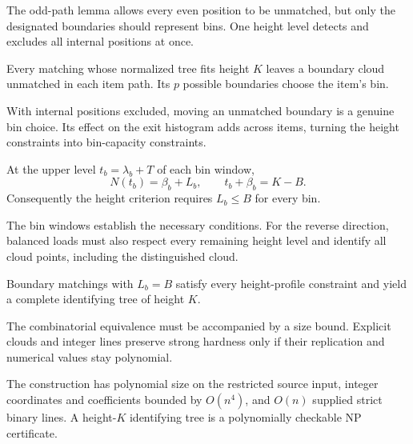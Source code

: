 The odd-path lemma allows every even position to be unmatched,
but only the designated boundaries should represent bins. One height
level detects and excludes all internal positions at once.

\begin{proposition}
\label{prop:height-boundaries}
Every matching whose normalized tree fits height $K$ leaves a
boundary cloud unmatched in each item path. Its $p$ possible boundaries choose the item's bin.
\end{proposition}

With internal positions excluded, moving an unmatched boundary is
a genuine bin choice. Its effect on the exit histogram adds across
items, turning the height constraints into bin-capacity constraints.

\begin{proposition}
\label{prop:height-windows}
At the upper level $t_b=\lambda_b+T$ of each bin window,
\[
 N(t_b)=\beta_b+L_b,\qquad t_b+\beta_b=K-B.
\]
Consequently the height criterion requires $L_b\le B$ for every bin.
\end{proposition}

The bin windows establish the necessary conditions. For the reverse
direction, balanced loads must also respect every remaining height
level and identify all cloud points, including the distinguished cloud.

\begin{proposition}
\label{prop:height-completeness}
Boundary matchings with $L_b=B$ satisfy every height-profile constraint
and yield a complete identifying tree of height $K$.
\end{proposition}

The combinatorial equivalence must be accompanied by a size bound.
Explicit clouds and integer lines preserve strong hardness only if
their replication and numerical values stay polynomial.

\begin{proposition}
\label{prop:height-encoding}
The construction has polynomial size on the restricted source input,
integer coordinates and coefficients bounded by $O(n^4)$, and $O(n)$
supplied strict binary lines. A height-$K$ identifying tree is a
polynomially checkable NP certificate.
\end{proposition}

